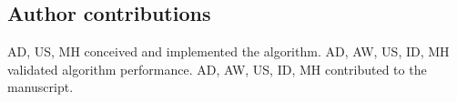




    \subsection*{Author contributions}
    AD, US, MH conceived and implemented the algorithm.
    AD, AW, US, ID, MH validated algorithm performance.
    AD, AW, US, ID, MH contributed to the manuscript.

